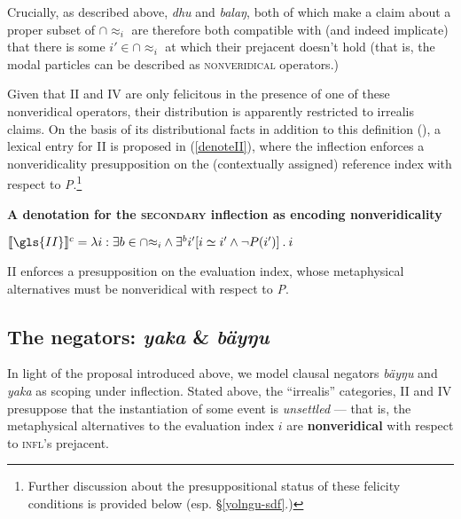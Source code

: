 \xe


Crucially, as described above, \textit{dhu} and \textit{balaŋ}, both of which make a claim about a proper subset of $ \cap{\approx_i} $ are therefore both compatible with (and indeed implicate) that there is some $ i'\in\cap{\approx_i} $ at which their prejacent doesn't hold (that is, the modal particles can be described as \textsc{nonveridical} operators.)

Given that \gls{II} and \gls{IV} are only felicitous in the presence of one of these nonveridical operators, their distribution is apparently restricted to irrealis claims. On the basis of its distributional facts in addition to this definition (\lastx), a lexical entry for \gls{II} is proposed in (\ref{denoteII}), where the inflection enforces a nonveridicality presupposition on the (contextually assigned) reference index with respect to \textit{P}.\footnote{Further discussion about the presuppositional status of these felicity conditions is provided below (esp. \S\ref{yolngu-sdf}.)}

\begin{shaded}
\pex\label{denoteII}\textbf{A denotation for the \textsc{secondary} inflection as encoding nonveridicality}


$ \denote[c]{\gls{II}}=\lambda i:\exists b\in\cap{\approx_i}\wedge\exists^b i'[i\simeq i'\wedge\neg P(i')]\mathbin.i$

\gls{II} enforces a presupposition on the evaluation index, whose metaphysical alternatives must be nonveridical with respect to \textit{P}.
\xe
\end{shaded}




\subsection{The negators: \textit{yaka} \& \textit{bäyŋu}}

In light of the proposal introduced above, we model clausal negators \textit{bäyŋu} and \textit{yaka} as scoping under inflection. Stated above, the ``irrealis'' categories, \gls{II} and \gls{IV} presuppose that the instantiation of some event is \textit{unsettled} --- that is, the metaphysical alternatives to the evaluation index $ i $ are \textbf{nonveridical} with respect to \textsc{infl}'s prejacent. 

